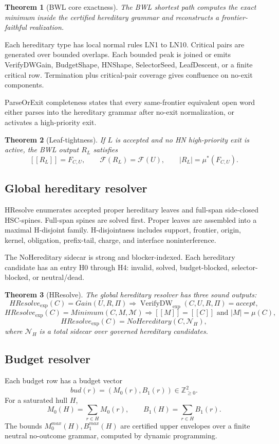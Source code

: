 \documentclass[10.5pt,a4paper]{article}
\newtheorem{theorem}{Theorem}[section]
\newcommand{\Front}{\mathcal F}
\newcommand{\VerifyDW}{\operatorname{VerifyDW}_{\exp}}
\begin{document}
\begin{theorem}[BWL core exactness]
The BWL shortest path computes the exact minimum inside the certified hereditary grammar and reconstructs a frontier-faithful realization.
\end{theorem}

Each hereditary type has local normal rules LN1 to LN10. Critical pairs are generated over bounded overlaps. Each bounded peak is joined or emits VerifyDWGain, BudgetShape, HNShape, SelectorSeed, LeafDescent, or a finite critical row. Termination plus critical-pair coverage gives confluence on no-exit components.

ParseOrExit completeness states that every same-frontier equivalent open word either parses into the hereditary grammar after no-exit normalization, or activates a high-priority exit.

\begin{theorem}[Leaf-tightness]
If \(L\) is accepted and no HN high-priority exit is active, the BWL output \(R_L\) satisfies
\[
[[R_L]]=F_{C,U},\qquad \Front(R_L)=\Front(U),\qquad |R_L|=\mu^*(F_{C,U}).
\]
\end{theorem}

\subsection{Global hereditary resolver}
HResolve enumerates accepted proper hereditary leaves and full-span side-closed HSC-spines. Full-span spines are solved first. Proper leaves are assembled into a maximal H-disjoint family. H-disjointness includes support, frontier, origin, kernel, obligation, prefix-tail, charge, and interface noninterference.

The NoHereditary sidecar is strong and blocker-indexed. Each hereditary candidate has an entry H0 through H4: invalid, solved, budget-blocked, selector-blocked, or neutral/dead.

\begin{theorem}[HResolve]
The global hereditary resolver has three sound outputs:
\[
HResolve_{\exp}(C)=Gain(U,R,\Pi)\Rightarrow \VerifyDW(C,U,R,\Pi)=accept,
\]
\[
HResolve_{\exp}(C)=Minimum(C,M,\mathcal M)\Rightarrow [[M]]=[[C]]\text{ and }|M|=\mu(C),
\]
\[
HResolve_{\exp}(C)=NoHereditary(C,\mathcal N_H),
\]
where \(\mathcal N_H\) is a total sidecar over governed hereditary candidates.
\end{theorem}

\subsection{Budget resolver}
Each budget row has a budget vector
\[
bud(r)=(M_0(r),B_1(r))\in\mathbb Z_{\ge0}^2.
\]
For a saturated hull \(H\),
\[
M_0(H)=\sum_{r\in H}M_0(r),\qquad B_1(H)=\sum_{r\in H}B_1(r).
\]
The bounds \(M_0^{max}(H),B_1^{max}(H)\) are certified upper envelopes over a finite neutral no-outcome grammar, computed by dynamic programming.
\end{document}
